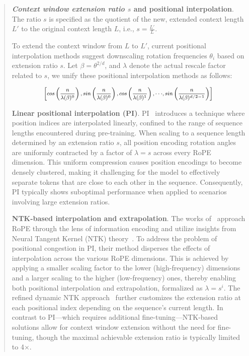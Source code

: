 \begin{abstract}
\textbf{\emph{Context window extension ratio $s$} and positional interpolation}. The ratio $s$ is specified as the quotient of the new, extended context length $L'$ to the original context length $L$, i.e., $s=\frac{L'}{L}$.

To extend the context window from $L$ to $L'$, current positional interpolation methods suggest downscaling rotation frequencies $\theta_i$ based on extension ratio $s$. Let $\beta=\theta^{2/d}$, and $\lambda$ denote the actual rescale factor related to $s$, we   unify these positional interpolation methods as follows:

\begin{equation}	
	\fontsize{7.5}{7.5} \selectfont
	\label{eq:unified_rope}
	\begin{aligned}
		\left[cos\left(\frac{n}{\lambda(\beta)^0}\right), sin \left(\frac{n}{\lambda(\beta)^0}\right), cos\left(\frac{n}{\lambda(\beta)^1}\right), \cdot\cdot\cdot,  sin \left(\frac{n}{\lambda(\beta)^{d/2-1}}\right) \right]   
	\end{aligned}
\end{equation}

\textbf{Linear positional interpolation (PI)}. PI~\cite{pi} introduces a technique where position indices are interpolated linearly, confined to the range of sequence lengths encountered during pre-training. When scaling to a sequence length determined by an extension ratio $s$, all position encoding rotation angles are uniformly contracted by a factor of $\lambda=s$ across every RoPE dimension. This uniform compression causes position encodings to become densely clustered, making it challenging for the model to effectively separate tokens that are close to each other in the sequence. Consequently, PI typically shows suboptimal performance when applied to scenarios involving large extension ratios.

\textbf{NTK-based interpolation and extrapolation}. The works of~\cite{ntk,dynamicntk} approach RoPE through the lens of information encoding and utilize insights from Neural Tangent Kernel (NTK) theory~\cite{jacot2018neural,tancik2020fourier}. To address the problem of positional congestion in PI, their method disperses the effects of interpolation across the various RoPE dimensions. This is achieved by applying a smaller scaling factor to the lower (high-frequency) dimensions and a larger scaling to the higher (low-frequency) ones, thereby enabling both positional interpolation and extrapolation, formalized as $\lambda=s^{i}$. The refined dynamic NTK approach~\cite{dynamicntk} further customizes the extension ratio at each positional index depending on the sequence's current length. In contrast to PI—which requires additional fine-tuning—NTK-based solutions allow for context window extension without the need for fine-tuning, though the maximal achievable extension ratio is typically limited to 4$\times$.


\end{abstract}
